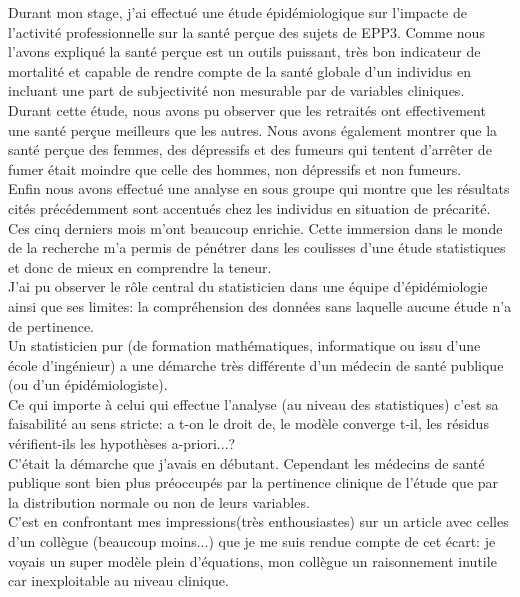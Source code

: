 \documentclass{book}
\begin{document}
\noindent
Durant mon stage, j'ai effectué une étude épidémiologique sur l'impacte de l'activité professionnelle sur la santé perçue des sujets de EPP3. Comme nous l'avons expliqué la santé perçue est un outils puissant, très bon indicateur de mortalité et capable de rendre compte de la santé globale d'un individus en incluant une part de subjectivité non mesurable par de variables cliniques.\\

\bigskip
\noindent
Durant cette étude, nous avons pu observer que les retraités ont effectivement une santé perçue meilleurs que les autres. Nous avons également montrer que la santé perçue des femmes, des dépressifs et des fumeurs qui tentent d'arrêter de fumer était moindre que celle des hommes, non dépressifs et non fumeurs.\\

\bigskip
\noindent
Enfin nous avons effectué une analyse en sous groupe qui montre que les résultats cités précédemment sont accentués chez les individus en situation de précarité.\\

\bigskip
\noindent
Ces cinq derniers mois m'ont beaucoup enrichie. Cette immersion dans le monde de la recherche m'a permis de pénétrer dans les coulisses d'une étude statistiques et donc de mieux en comprendre la teneur.\\
J'ai pu observer le rôle central du statisticien dans une équipe d'épidémiologie ainsi que ses limites: la compréhension des données sans laquelle aucune étude n'a de pertinence.\\

\bigskip
\noindent
Un statisticien pur (de formation mathématiques, informatique ou issu d'une école d'ingénieur) a une démarche très différente d'un médecin de santé publique (ou d'un épidémiologiste).\\
Ce qui importe à celui qui effectue l'analyse (au niveau des statistiques) c'est sa faisabilité au sens stricte: a t-on le droit de, le modèle converge t-il, les résidus vérifient-ils les hypothèses a-priori...? \\
C'était la démarche que j'avais en débutant. Cependant les médecins de santé publique sont bien plus préoccupés par la pertinence clinique de l'étude que par la distribution normale ou non de leurs variables.\\
C'est en confrontant mes impressions(très enthousiastes) sur un article avec celles d'un collègue (beaucoup moins...) que je me suis rendue compte de cet écart: je voyais un super modèle plein d'équations, mon collègue un raisonnement inutile car inexploitable au niveau clinique.\\
\end{document}
